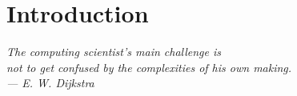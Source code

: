 \chapter{Introduction}\label{ch:intro}
\begin{flushright}{\slshape
    The computing scientist’s main challenge is\\
    not to get confused by the complexities of his own making.\\ \medskip
    --- E. W. Dijkstra
}
\end{flushright}





